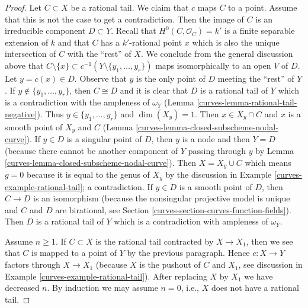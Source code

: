 \begin{proof}
\medskip\noindent
Let $C \subset X$ be a rational tail.
We claim that $c$ maps $C$ to a point. Assume that this
is not the case to get a contradiction. Then the image
of $C$ is an irreducible component $D \subset Y$.
Recall that $H^0(C, \mathcal{O}_C) = k'$ is a finite separable
extension of $k$ and that $C$ has a $k'$-rational point $x$
which is also the unique intersection of $C$ with the ``rest'' of $X$.
We conclude from the general discussion above that
$C \setminus \{x\} \subset c^{-1}(Y \setminus \{y_1, \ldots, y_r\})$
maps isomorphically to an open $V$ of $D$. Let $y = c(x) \in D$.
Observe that $y$ is the only point of $D$ meeting the
``rest'' of $Y$. If $y \not \in \{y_1, \ldots, y_r\}$, then $C \cong D$
and it is clear that $D$ is a rational tail of $Y$ which is
a contradiction with the ampleness of $\omega_Y$
(Lemma \ref{curves-lemma-rational-tail-negative}).
Thus $y \in \{y_1, \ldots, y_r\}$ and $\dim(X_y) = 1$.
Then $x \in X_y \cap C$ and $x$ is a smooth point of $X_y$ and $C$
(Lemma \ref{curves-lemma-closed-subscheme-nodal-curve}).
If $y \in D$ is a singular point of $D$, then $y$ is a node
and then $Y = D$ (because there cannot be another component of
$Y$ passing through $y$ by Lemma \ref{curves-lemma-closed-subscheme-nodal-curve}).
Then $X = X_y \cup C$ which means $g = 0$ because it is
equal to the genus of $X_y$ by the discussion in
Example \ref{curves-example-rational-tail}; a contradiction.
If $y \in D$ is a smooth point of $D$, then
$C \to D$ is an isomorphism (because the nonsingular projective
model is unique and $C$ and $D$ are birational, see
Section \ref{curves-section-curves-function-fields}). Then $D$ is
a rational tail of $Y$ which is a contradiction with
ampleness of $\omega_Y$.

\medskip\noindent
Assume $n \geq 1$. If $C \subset X$ is the rational tail contracted
by $X \to X_1$, then we see that $C$ is mapped to a point of $Y$ by
the previous paragraph. Hence $c : X \to Y$ factors through $X \to X_1$
(because $X$ is the pushout of $C$ and $X_1$, see discussion in
Example \ref{curves-example-rational-tail}).
After replacing $X$ by $X_1$ we have decreased
$n$. By induction we may assume $n = 0$, i.e., $X$ does not have
a rational tail.


\end{proof}
